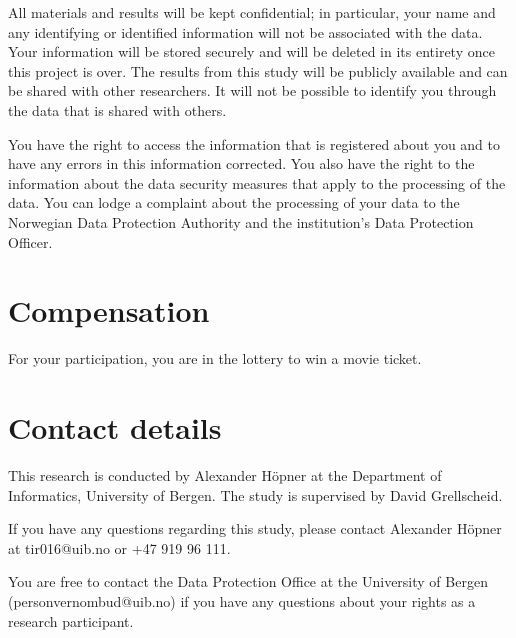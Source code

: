 All materials and results will be kept confidential; in particular, your name and any identifying or identified information will not be associated with the data. Your information will be stored securely and will be deleted in its entirety once this project is over. The results from this study will be publicly available and can be shared with other researchers. It will not be possible to identify you through the data that is shared with others. 

You have the right to access the information that is registered about you and to have any errors in this information corrected. You also have the right to the information about the data security measures that apply to the processing of the data. You can lodge a complaint about the processing of your data to the Norwegian Data Protection Authority and the institution’s Data Protection Officer.

\section*{Compensation}
For your participation, you are in the lottery to win a movie ticket.

\section*{Contact details}
This research is conducted by Alexander Höpner at the Department of Informatics, University of Bergen. The study is supervised by David Grellscheid. 

If you have any questions regarding this study, please contact Alexander Höpner at tir016@uib.no or +47 919 96 111.

You are free to contact the Data Protection Office at the University of Bergen (personvernombud@uib.no) if you have any questions about your rights as a research participant.